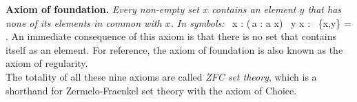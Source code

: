 \textbf{Axiom of foundation.} \emph{Every non-empty set $x$ contains an element $y$ that has none of its elements in common with $x$. In symbols:}
\bse
\forall \, x : (\exists \,a : a \in x) \imp \exists \, y \in x : \bigcap \, \{x,y\} = \vn .
\ese
An immediate consequence of this axiom is that there is no set that contains
itself as an element. For reference, the axiom of foundation is also known as
the axiom of regularity.\\

The totality of all these nine axioms are called \emph{ZFC set theory}, which is a shorthand for Zermelo-Fraenkel set theory with the axiom of Choice.
